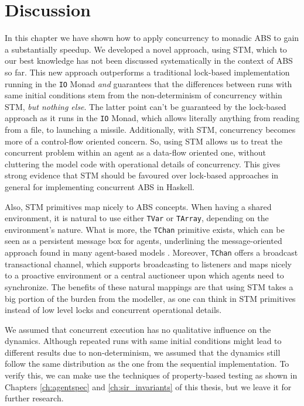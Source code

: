 \section{Discussion}
\label{sec:conc_disc}
In this chapter we have shown how to apply concurrency to monadic ABS to gain a substantially speedup. We developed a novel approach, using STM, which to our best knowledge has not been discussed systematically in the context of ABS so far. This new approach outperforms a traditional lock-based implementation running in the \texttt{IO} Monad \textit{and} guarantees that the differences between runs with same initial conditions stem from the non-determinism of concurrency within STM, \textit{but nothing else}. The latter point can't be guaranteed by the lock-based approach as it runs in the \texttt{IO} Monad, which allows literally anything from reading from a file, to launching a missile. Additionally, with STM, concurrency becomes more of a control-flow oriented concern. So, using STM allows us to treat the concurrent problem within an agent as a data-flow oriented one, without cluttering the model code with operational details of concurrency. This gives strong evidence that STM should be favoured over lock-based approaches in general for implementing concurrent ABS in Haskell.

Also, STM primitives map nicely to ABS concepts. When having a shared environment, it is natural to use either \texttt{TVar} or \texttt{TArray}, depending on the environment's nature. What is more, the \texttt{TChan} primitive exists, which can be seen as a persistent message box for agents, underlining the message-oriented approach found in many agent-based models \cite{agha_actors:_1986, wooldridge_introduction_2009}. Moreover, \texttt{TChan} offers a broadcast transactional channel, which supports broadcasting to listeners and maps nicely to a proactive environment or a central auctioneer upon which agents need to synchronize. The benefits of these natural mappings are that using STM takes a big portion of the burden from the modeller, as one can think in STM primitives instead of low level locks and concurrent operational details. 

We assumed that concurrent execution has no qualitative influence on the dynamics. Although repeated runs with same initial conditions might lead to different results due to non-determinism, we assumed that the dynamics still follow the same distribution as the one from the sequential implementation. To verify this, we can make use the techniques of property-based testing as shown in Chapters \ref{ch:agentspec} and \ref{ch:sir_invariants} of this thesis, but we leave it for further research.

